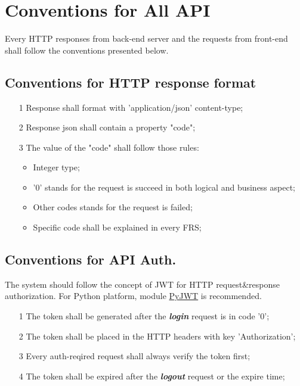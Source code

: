 \section{Conventions for All API}

 {\parindent0pt

  Every HTTP responses from back-end server and the requests from front-end shall follow the conventions presented below.

  \subsection*{Conventions for HTTP response format}

  \begin{itemize}
	  \item[1] Response shall format with 'application/json' content-type;
	  \item[2] Response json shall contain a property "code";
	  \item[3] The value of the "code" shall follow those rules:
		  \begin{itemize}
			  \item Integer type;
			  \item '0' stands for the request is succeed in both logical and business aspect;
			  \item Other codes stands for the request is failed;
			  \item Specific code shall be explained in every FRS;
		  \end{itemize}
  \end{itemize}

  \subsection*{Conventions for API Auth.}

  The system should follow the concept of JWT for HTTP request\&response authorization.
  For Python platform, module \href{https://github.com/jpadilla/pyjwt}{PyJWT} is recommended.

  \begin{itemize}
	  \item[1] The token shall be generated after the \textit{\textbf{login}} request is in code '0';
	  \item[2] The token shall be placed in the HTTP headers with key 'Authorization';
	  \item[3] Every auth-reqired request shall always verify the token first;
	  \item[4] The token shall be expired after the \textit{\textbf{logout}} request or the expire time;
  \end{itemize}

}
